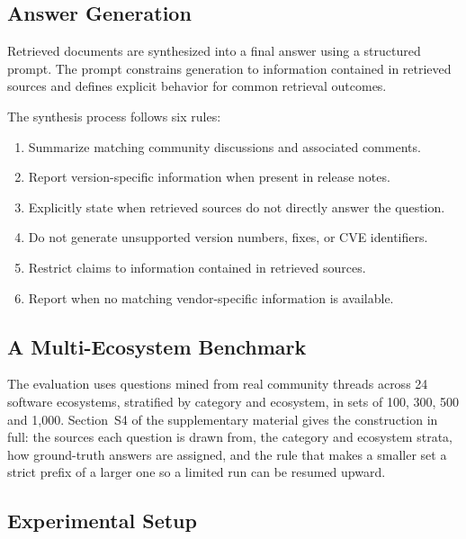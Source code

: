 \documentclass[acmsmall,review,anonymous,screen]{acmart}
\begin{document}
\subsection{Answer Generation}

Retrieved documents are synthesized into a final answer using a
structured prompt. The prompt constrains generation to information
contained in retrieved sources and defines explicit behavior for
common retrieval outcomes.

The synthesis process follows six rules:

\begin{enumerate}
\item Summarize matching community discussions and associated comments.
\item Report version-specific information when present in release notes.
\item Explicitly state when retrieved sources do not directly answer the question.
\item Do not generate unsupported version numbers, fixes, or CVE identifiers.
\item Restrict claims to information contained in retrieved sources.
\item Report when no matching vendor-specific information is available.
\end{enumerate}

\subsection{A Multi-Ecosystem Benchmark}\label{sec:benchmark}

The evaluation uses questions mined from real community threads across 24
software ecosystems, stratified by category and ecosystem, in sets of 100,
300, 500 and 1{,}000. Section~S4 of the supplementary material gives the
construction in full: the sources each question is drawn from, the category
and ecosystem strata, how ground-truth answers are assigned, and the rule that
makes a smaller set a strict prefix of a larger one so a limited run can be
resumed upward.

\subsection{Experimental Setup}\label{sec:setup}
\end{document}
